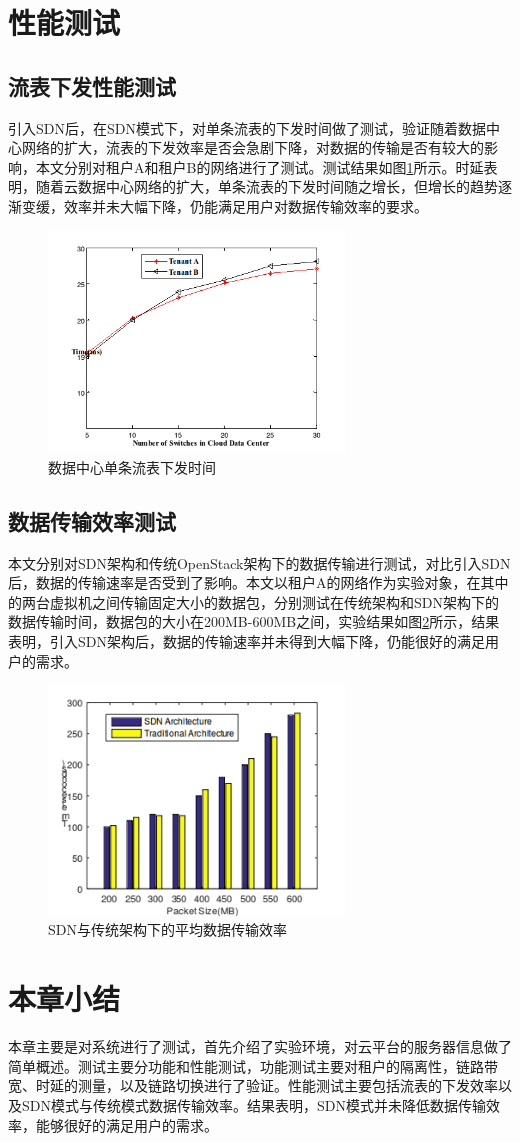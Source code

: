 \section{性能测试}
\subsection{流表下发性能测试}
引入SDN后，在SDN模式下，对单条流表的下发时间做了测试，验证随着数据中心网络的扩大，流表的下发效率是否会急剧下降，对数据的传输是否有较大的影响，本文分别对租户A和租户B的网络进行了测试。测试结果如图\ref{fig:flow-time}所示。时延表明，随着云数据中心网络的扩大，单条流表的下发时间随之增长，但增长的趋势逐渐变缓，效率并未大幅下降，仍能满足用户对数据传输效率的要求。

\begin{figure}[!htb]
  \centering
  \includegraphics[width=0.7\textwidth,height=0.40\textwidth]{logo/flow-time.png}
  \caption{数据中心单条流表下发时间}
  \label{fig:flow-time}
\end{figure}
\subsection{数据传输效率测试}
本文分别对SDN架构和传统OpenStack架构下的数据传输进行测试，对比引入SDN后，数据的传输速率是否受到了影响。本文以租户A的网络作为实验对象，在其中的两台虚拟机之间传输固定大小的数据包，分别测试在传统架构和SDN架构下的数据传输时间，数据包的大小在200MB-600MB之间，实验结果如图\ref{fig:transmission}所示，结果表明，引入SDN架构后，数据的传输速率并未得到大幅下降，仍能很好的满足用户的需求。
\begin{figure}[!htb]
  \centering
  \includegraphics[width=0.7\textwidth,height=0.40\textwidth]{logo/transmission.png}
  \caption{SDN与传统架构下的平均数据传输效率}
  \label{fig:transmission}
\end{figure}
\section{本章小结}
本章主要是对系统进行了测试，首先介绍了实验环境，对云平台的服务器信息做了简单概述。测试主要分功能和性能测试，功能测试主要对租户的隔离性，链路带宽、时延的测量，以及链路切换进行了验证。性能测试主要包括流表的下发效率以及SDN模式与传统模式数据传输效率。结果表明，SDN模式并未降低数据传输效率，能够很好的满足用户的需求。